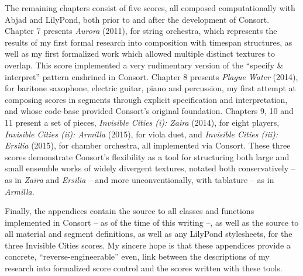 The remaining chapters consist of five scores, all composed computationally
with Abjad and LilyPond, both prior to and after the development of Consort.
Chapter 7 presents \emph{Aurora} (2011), for string orchestra, which represents
the results of my first formal research into composition with timespan
structures, as well as my first formalized work which allowed multiple distinct
textures to overlap. This score implemented a very rudimentary version of the
\enquote{specify \& interpret} pattern enshrined in Consort. Chapter 8 presents
\emph{Plague Water} (2014), for baritone saxophone, electric guitar, piano and
percussion, my first attempt at composing scores in segments through explicit
specification and interpretation, and whose code-base provided Consort's
original foundation. Chapters 9, 10 and 11 present a set of pieces,
\emph{Invisible Cities (i): Zaira} (2014), for eight players, \emph{Invisible
Cities (ii): Armilla} (2015), for viola duet, and \emph{Invisible Cities (iii):
Ersilia} (2015), for chamber orchestra, all implemented via Consort. These
three scores demonstrate Consort's flexibility as a tool for structuring both
large and small ensemble works of widely divergent textures, notated both
conservatively -- as in \emph{Zaira} and \emph{Ersilia} -- and more
unconventionally, with tablature -- as in \emph{Armilla}.

Finally, the appendices contain the source to all classes and functions
implemented in Consort -- as of the time of this writing --, as well as the
source to all material and segment definitions, as well as any LilyPond
stylesheets, for the three Invisible Cities scores. My sincere hope is that
these appendices provide a concrete, \enquote{reverse-engineerable} even, link
between the descriptions of my research into formalized score control and the
scores written with these tools.

